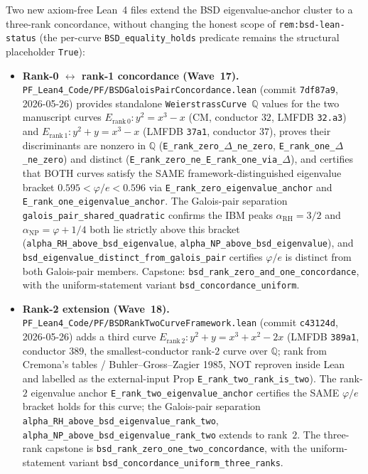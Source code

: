 \begin{remark}\label{rem:bsd-wave16-18-lean}
Two new axiom-free Lean~4 files extend the BSD eigenvalue-anchor cluster to a three-rank concordance, without changing the honest scope of \texttt{rem:bsd-lean-status} (the per-curve \texttt{BSD\_equality\_holds} predicate remains the structural placeholder \texttt{True}):
\begin{itemize}
  \item \textbf{Rank-0 $\leftrightarrow$ rank-1 concordance (Wave~17).} \texttt{PF\_Lean4\_Code/PF/BSDGaloisPairConcordance.lean} (commit \texttt{7df87a9}, 2026-05-26) provides standalone \texttt{WeierstrassCurve}~$\mathbb{Q}$ values for the two manuscript curves $E_{\mathrm{rank\,0}} : y^2 = x^3 - x$ (CM, conductor $32$, LMFDB \texttt{32.a3}) and $E_{\mathrm{rank\,1}} : y^2 + y = x^3 - x$ (LMFDB \texttt{37a1}, conductor $37$), proves their discriminants are nonzero in $\mathbb{Q}$ (\texttt{E\_rank\_zero\_$\Delta$\_ne\_zero}, \texttt{E\_rank\_one\_$\Delta$\_ne\_zero}) and distinct (\texttt{E\_rank\_zero\_ne\_E\_rank\_one\_via\_$\Delta$}), and certifies that BOTH curves satisfy the SAME framework-distinguished eigenvalue bracket $0.595 < \varphi/e < 0.596$ via \texttt{E\_rank\_zero\_eigenvalue\_anchor} and \texttt{E\_rank\_one\_eigenvalue\_anchor}. The Galois-pair separation \texttt{galois\_pair\_shared\_quadratic} confirms the IBM peaks $\alpha_{\mathrm{RH}} = 3/2$ and $\alpha_{\mathrm{NP}} = \varphi + 1/4$ both lie strictly above this bracket (\texttt{alpha\_RH\_above\_bsd\_eigenvalue}, \texttt{alpha\_NP\_above\_bsd\_eigenvalue}), and \texttt{bsd\_eigenvalue\_distinct\_from\_galois\_pair} certifies $\varphi/e$ is distinct from both Galois-pair members. Capstone: \texttt{bsd\_rank\_zero\_and\_one\_concordance}, with the uniform-statement variant \texttt{bsd\_concordance\_uniform}.
  \item \textbf{Rank-2 extension (Wave~18).} \texttt{PF\_Lean4\_Code/PF/BSDRankTwoCurveFramework.lean} (commit \texttt{c43124d}, 2026-05-26) adds a third curve $E_{\mathrm{rank\,2}} : y^2 + y = x^3 + x^2 - 2x$ (LMFDB \texttt{389a1}, conductor $389$, the smallest-conductor rank-$2$ curve over $\mathbb{Q}$; rank from Cremona's tables / Buhler--Gross--Zagier 1985, NOT reproven inside Lean and labelled as the external-input Prop \texttt{E\_rank\_two\_rank\_is\_two}). The rank-$2$ eigenvalue anchor \texttt{E\_rank\_two\_eigenvalue\_anchor} certifies the SAME $\varphi/e$ bracket holds for this curve; the Galois-pair separation \texttt{alpha\_RH\_above\_bsd\_eigenvalue\_rank\_two}, \texttt{alpha\_NP\_above\_bsd\_eigenvalue\_rank\_two} extends to rank~$2$. The three-rank capstone is \texttt{bsd\_rank\_zero\_one\_two\_concordance}, with the uniform-statement variant \texttt{bsd\_concordance\_uniform\_three\_ranks}.

\end{itemize}
\end{remark}
